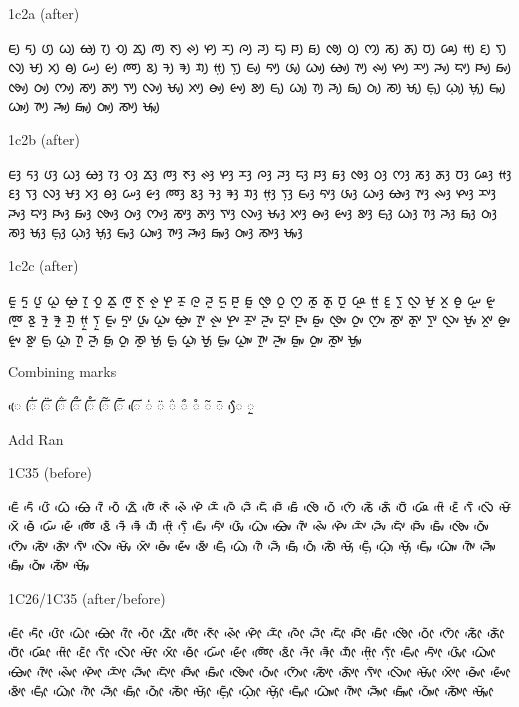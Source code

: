 \noindent
1c2a (after)

\noindent
ᰀᰪ ᰁᰪ ᰂᰪ ᰃᰪ ᰄᰪ ᰅᰪ ᰆᰪ ᰇᰪ ᰈᰪ ᰉᰪ ᰊᰪ ᰋᰪ ᰌᰪ ᰍᰪ ᰎᰪ ᰏᰪ ᰐᰪ ᰑᰪ ᰒᰪ ᰓᰪ ᰔᰪ ᰕᰪ ᰖᰪ ᰗᰪ ᰘᰪ ᰙᰪ ᰚᰪ ᰛᰪ ᰜᰪ ᰝᰪ ᰞᰪ ᰟᰪ ᰠᰪ ᰡᰪ ᰢᰪ ᰣᰪ ᱍᰪ ᱎᰪ ᱏᰪ ᰙ᰷ᰪ ᰛ᰷ᰪ ᰀᰤᰪ ᰁᰤᰪ ᰂᰤᰪ ᰃᰤᰪ ᰄᰤᰪ ᰅᰤᰪ ᰊᰤᰪ ᰋᰤᰪ ᰌᰤᰪ ᰎᰤᰪ ᰏᰤᰪ ᰐᰤᰪ ᰑᰤᰪ ᰒᰤᰪ ᰓᰤᰪ ᰔᰤᰪ ᰕᰤᰪ ᰖᰤᰪ ᰛᰤᰪ ᰜᰤᰪ ᰝᰤᰪ ᰞᰤᰪ ᰟᰤᰪ ᰡᰤᰪ ᰣᰤᰪ ᰀᰥᰪ ᰃᰥᰪ ᰅᰥᰪ ᰎᰥᰪ ᰑᰥᰪ ᰓᰥᰪ ᰕᰥᰪ ᰝᰥᰪ ᰀ᰷ᰥᰪ ᰃ᰷ᰥᰪ ᰝ᰷ᰥᰪ ᰀᰥᰤᰪ ᰃᰥᰤᰪ ᰅᰥᰤᰪ ᰎᰥᰤᰪ ᰑᰥᰤᰪ ᰓᰥᰤᰪ ᰕᰥᰤᰪ ᰝᰥᰤᰪ 

\noindent
1c2b (after)

\noindent
ᰀᰫ ᰁᰫ ᰂᰫ ᰃᰫ ᰄᰫ ᰅᰫ ᰆᰫ ᰇᰫ ᰈᰫ ᰉᰫ ᰊᰫ ᰋᰫ ᰌᰫ ᰍᰫ ᰎᰫ ᰏᰫ ᰐᰫ ᰑᰫ ᰒᰫ ᰓᰫ ᰔᰫ ᰕᰫ ᰖᰫ ᰗᰫ ᰘᰫ ᰙᰫ ᰚᰫ ᰛᰫ ᰜᰫ ᰝᰫ ᰞᰫ ᰟᰫ ᰠᰫ ᰡᰫ ᰢᰫ ᰣᰫ ᱍᰫ ᱎᰫ ᱏᰫ ᰙ᰷ᰫ ᰛ᰷ᰫ ᰀᰤᰫ ᰁᰤᰫ ᰂᰤᰫ ᰃᰤᰫ ᰄᰤᰫ ᰅᰤᰫ ᰊᰤᰫ ᰋᰤᰫ ᰌᰤᰫ ᰎᰤᰫ ᰏᰤᰫ ᰐᰤᰫ ᰑᰤᰫ ᰒᰤᰫ ᰓᰤᰫ ᰔᰤᰫ ᰕᰤᰫ ᰖᰤᰫ ᰛᰤᰫ ᰜᰤᰫ ᰝᰤᰫ ᰞᰤᰫ ᰟᰤᰫ ᰡᰤᰫ ᰣᰤᰫ ᰀᰥᰫ ᰃᰥᰫ ᰅᰥᰫ ᰎᰥᰫ ᰑᰥᰫ ᰓᰥᰫ ᰕᰥᰫ ᰝᰥᰫ ᰀ᰷ᰥᰫ ᰃ᰷ᰥᰫ ᰝ᰷ᰥᰫ ᰀᰥᰤᰫ ᰃᰥᰤᰫ ᰅᰥᰤᰫ ᰎᰥᰤᰫ ᰑᰥᰤᰫ ᰓᰥᰤᰫ ᰕᰥᰤᰫ ᰝᰥᰤᰫ 

\noindent
1c2c (after)

\noindent
ᰀᰬ ᰁᰬ ᰂᰬ ᰃᰬ ᰄᰬ ᰅᰬ ᰆᰬ ᰇᰬ ᰈᰬ ᰉᰬ ᰊᰬ ᰋᰬ ᰌᰬ ᰍᰬ ᰎᰬ ᰏᰬ ᰐᰬ ᰑᰬ ᰒᰬ ᰓᰬ ᰔᰬ ᰕᰬ ᰖᰬ ᰗᰬ ᰘᰬ ᰙᰬ ᰚᰬ ᰛᰬ ᰜᰬ ᰝᰬ ᰞᰬ ᰟᰬ ᰠᰬ ᰡᰬ ᰢᰬ ᰣᰬ ᱍᰬ ᱎᰬ ᱏᰬ ᰙ᰷ᰬ ᰛ᰷ᰬ ᰀᰤᰬ ᰁᰤᰬ ᰂᰤᰬ ᰃᰤᰬ ᰄᰤᰬ ᰅᰤᰬ ᰊᰤᰬ ᰋᰤᰬ ᰌᰤᰬ ᰎᰤᰬ ᰏᰤᰬ ᰐᰤᰬ ᰑᰤᰬ ᰒᰤᰬ ᰓᰤᰬ ᰔᰤᰬ ᰕᰤᰬ ᰖᰤᰬ ᰛᰤᰬ ᰜᰤᰬ ᰝᰤᰬ ᰞᰤᰬ ᰟᰤᰬ ᰡᰤᰬ ᰣᰤᰬ ᰀᰥᰬ ᰃᰥᰬ ᰅᰥᰬ ᰎᰥᰬ ᰑᰥᰬ ᰓᰥᰬ ᰕᰥᰬ ᰝᰥᰬ ᰀ᰷ᰥᰬ ᰃ᰷ᰥᰬ ᰝ᰷ᰥᰬ ᰀᰥᰤᰬ ᰃᰥᰤᰬ ᰅᰥᰤᰬ ᰎᰥᰤᰬ ᰑᰥᰤᰬ ᰓᰥᰤᰬ ᰕᰥᰤᰬ ᰝᰥᰤᰬ 

\noindent
Combining marks

\noindent
◌ᰨᰵ ◌ᰩᰭ ◌ᰩᰮ ◌ᰩᰯ ◌ᰩᰰ ◌ᰩᰱ ◌ᰩᰲ ◌ᰩᰳ ◌ᰩᰵ 
\noindent
◌ᰭ ◌ᰮ ◌ᰯ ◌ᰰ ◌ᰱ ◌ᰲ ◌ᰳ ◌ᰧᰵ ◌ᰬ

\noindent
Add Ran

\noindent
1C35 (before)

\noindent
ᰀᰵᰶ ᰁᰵᰶ ᰂᰵᰶ ᰃᰵᰶ ᰄᰵᰶ ᰅᰵᰶ ᰆᰵᰶ ᰇᰵᰶ ᰈᰵᰶ ᰉᰵᰶ ᰊᰵᰶ ᰋᰵᰶ ᰌᰵᰶ ᰍᰵᰶ ᰎᰵᰶ ᰏᰵᰶ ᰐᰵᰶ ᰑᰵᰶ ᰒᰵᰶ ᰓᰵᰶ ᰔᰵᰶ ᰕᰵᰶ ᰖᰵᰶ ᰗᰵᰶ ᰘᰵᰶ ᰙᰵᰶ ᰚᰵᰶ ᰛᰵᰶ ᰜᰵᰶ ᰝᰵᰶ ᰞᰵᰶ ᰟᰵᰶ ᰠᰵᰶ ᰡᰵᰶ ᰢᰵᰶ ᰣᰵᰶ ᱍᰵᰶ ᱎᰵᰶ ᱏᰵᰶ ᰙ᰷ᰵᰶ ᰛ᰷ᰵᰶ ᰀᰤᰵᰶ ᰁᰤᰵᰶ ᰂᰤᰵᰶ ᰃᰤᰵᰶ ᰄᰤᰵᰶ ᰅᰤᰵᰶ ᰊᰤᰵᰶ ᰋᰤᰵᰶ ᰌᰤᰵᰶ ᰎᰤᰵᰶ ᰏᰤᰵᰶ ᰐᰤᰵᰶ ᰑᰤᰵᰶ ᰒᰤᰵᰶ ᰓᰤᰵᰶ ᰔᰤᰵᰶ ᰕᰤᰵᰶ ᰖᰤᰵᰶ ᰛᰤᰵᰶ ᰜᰤᰵᰶ ᰝᰤᰵᰶ ᰞᰤᰵᰶ ᰟᰤᰵᰶ ᰡᰤᰵᰶ ᰣᰤᰵᰶ ᰀᰥᰵᰶ ᰃᰥᰵᰶ ᰅᰥᰵᰶ ᰎᰥᰵᰶ ᰑᰥᰵᰶ ᰓᰥᰵᰶ ᰕᰥᰵᰶ ᰝᰥᰵᰶ ᰀ᰷ᰥᰵᰶ ᰃ᰷ᰥᰵᰶ ᰝ᰷ᰥᰵᰶ ᰀᰥᰤᰵᰶ ᰃᰥᰤᰵᰶ ᰅᰥᰤᰵᰶ ᰎᰥᰤᰵᰶ ᰑᰥᰤᰵᰶ ᰓᰥᰤᰵᰶ ᰕᰥᰤᰵᰶ ᰝᰥᰤᰵᰶ 

\noindent
1C26/1C35 (after/before)

\noindent
ᰀᰦᰵᰶ ᰁᰦᰵᰶ ᰂᰦᰵᰶ ᰃᰦᰵᰶ ᰄᰦᰵᰶ ᰅᰦᰵᰶ ᰆᰦᰵᰶ ᰇᰦᰵᰶ ᰈᰦᰵᰶ ᰉᰦᰵᰶ ᰊᰦᰵᰶ ᰋᰦᰵᰶ ᰌᰦᰵᰶ ᰍᰦᰵᰶ ᰎᰦᰵᰶ ᰏᰦᰵᰶ ᰐᰦᰵᰶ ᰑᰦᰵᰶ ᰒᰦᰵᰶ ᰓᰦᰵᰶ ᰔᰦᰵᰶ ᰕᰦᰵᰶ ᰖᰦᰵᰶ ᰗᰦᰵᰶ ᰘᰦᰵᰶ ᰙᰦᰵᰶ ᰚᰦᰵᰶ ᰛᰦᰵᰶ ᰜᰦᰵᰶ ᰝᰦᰵᰶ ᰞᰦᰵᰶ ᰟᰦᰵᰶ ᰠᰦᰵᰶ ᰡᰦᰵᰶ ᰢᰦᰵᰶ ᰣᰦᰵᰶ ᱍᰦᰵᰶ ᱎᰦᰵᰶ ᱏᰦᰵᰶ ᰙ᰷ᰦᰵᰶ ᰛ᰷ᰦᰵᰶ ᰀᰤᰦᰵᰶ ᰁᰤᰦᰵᰶ ᰂᰤᰦᰵᰶ ᰃᰤᰦᰵᰶ ᰄᰤᰦᰵᰶ ᰅᰤᰦᰵᰶ ᰊᰤᰦᰵᰶ ᰋᰤᰦᰵᰶ ᰌᰤᰦᰵᰶ ᰎᰤᰦᰵᰶ ᰏᰤᰦᰵᰶ ᰐᰤᰦᰵᰶ ᰑᰤᰦᰵᰶ ᰒᰤᰦᰵᰶ ᰓᰤᰦᰵᰶ ᰔᰤᰦᰵᰶ ᰕᰤᰦᰵᰶ ᰖᰤᰦᰵᰶ ᰛᰤᰦᰵᰶ ᰜᰤᰦᰵᰶ ᰝᰤᰦᰵᰶ ᰞᰤᰦᰵᰶ ᰟᰤᰦᰵᰶ ᰡᰤᰦᰵᰶ ᰣᰤᰦᰵᰶ ᰀᰥᰦᰵᰶ ᰃᰥᰦᰵᰶ ᰅᰥᰦᰵᰶ ᰎᰥᰦᰵᰶ ᰑᰥᰦᰵᰶ ᰓᰥᰦᰵᰶ ᰕᰥᰦᰵᰶ ᰝᰥᰦᰵᰶ ᰀ᰷ᰥᰦᰵᰶ ᰃ᰷ᰥᰦᰵᰶ ᰝ᰷ᰥᰦᰵᰶ ᰀᰥᰤᰦᰵᰶ ᰃᰥᰤᰦᰵᰶ ᰅᰥᰤᰦᰵᰶ ᰎᰥᰤᰦᰵᰶ ᰑᰥᰤᰦᰵᰶ ᰓᰥᰤᰦᰵᰶ ᰕᰥᰤᰦᰵᰶ ᰝᰥᰤᰦᰵᰶ 

